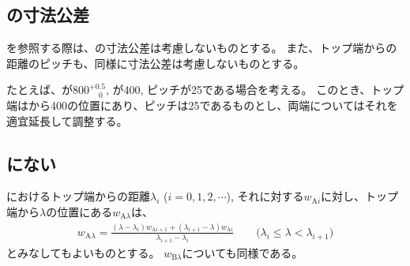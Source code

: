 \subsection{\nameIDTaperTable の寸法公差}
\IDTaperTable を参照する際は、\nameWorkTotalLength の寸法公差は考慮しないものとする。
また、トップ端からの距離のピッチも、同様に寸法公差は考慮しないものとする。
\begin{hosoku}
たとえば、\WorkTotalLength が$800^{+0.5}_{\phantom -0}$, \TopAlocationLength が400, ピッチが25である場合を考える。
このとき、トップ端は\AlocationCenter から400の位置にあり、ピッチは25であるものとし、両端についてはそれを適宜延長して調整する。
\end{hosoku}

\subsection{\IDTaperTable にない\InnerDiameter}
\nameIDTaperTable におけるトップ端からの距離$\lambda_i$ ($i = 0, 1, 2, \cdots$), それに対する\ACID $w_{\mathrm Ai}$に対し、トップ端から$\lambda$の位置にある\ACID$w_{\mathrm A\lambda}$は、
\begin{align*}
  w_{\mathrm A\lambda}
  = \frac{(\lambda-\lambda_i)w_{\mathrm Ai+1}+(\lambda_{i+1}-\lambda)w_{\mathrm Ai}}{\lambda_{i+1}-\lambda_i}
  \qquad
  \Big(\lambda_i \leq \lambda < \lambda_{i+1}\Big)
\end{align*}
とみなしてもよいものとする。
\BDID$w_{\mathrm B\lambda}$についても同様である。

